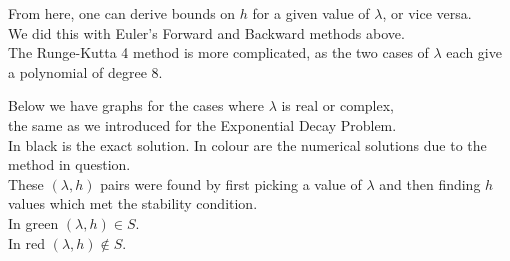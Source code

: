 \par From here, one can derive bounds on $h$ for a given value of $\lambda$, or vice versa.\\
We did this with Euler's Forward and Backward methods above.\\
The Runge-Kutta 4 method is more complicated, as the two cases of $\lambda$ each give a polynomial of degree 8.\\

\par Below we have graphs for the cases where $\lambda$ is real or complex,\\
the same as we introduced for the Exponential Decay Problem.\\
In black is the exact solution. In colour are the numerical solutions due to the method in question.\\
These $(\lambda, h)$ pairs were found by first picking a value of $\lambda$ and then finding $h$ values which met the stability condition.\\
In green $(\lambda, h) \in S$.\\
In red $(\lambda, h) \notin S$.
\newpage
